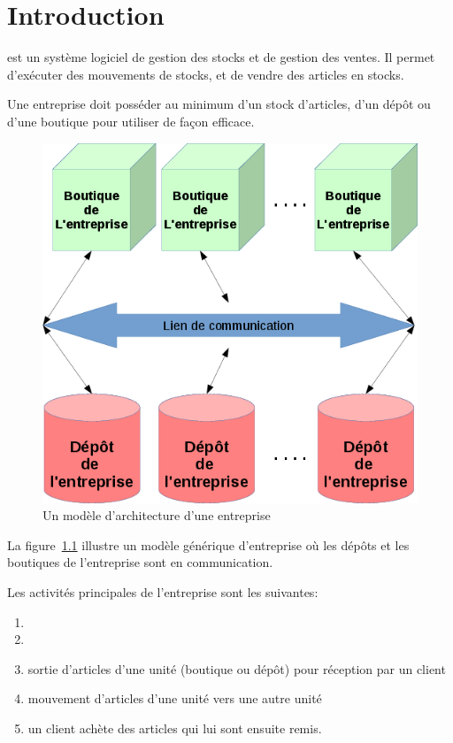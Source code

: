 \chapter{Introduction}\label{chap:introduction}

\yeren est un syst\`eme logiciel de gestion des
stocks et de gestion des ventes. Il permet
d'ex\'ecuter des mouvements de stocks, et de
vendre des articles en stocks.

Une entreprise doit poss\'eder au minimum d'un stock
d'articles, d'un d\'ep\^ot ou d'une boutique pour utiliser
\yeren de fa\c{c}on efficace.\\

\begin{figure}[!htpb]
	\centering
	\includegraphics[scale=0.63]{images/architecture-enterprise-yeren.png}
	\caption{Un mod\`ele d'architecture d'une entreprise}\label{fig:architecture-enterprise-yeren}
\end{figure}

La figure~\ref{fig:architecture-enterprise-yeren} illustre
un mod\`ele g\'en\'erique d'entreprise o\`u les d\'ep\^ots
et les boutiques de l'entreprise sont en communication.

Les activit\'es principales de l'entreprise sont les suivantes:
\begin{enumerate}[1)]
	\item {}
	\item {}
	\item {} sortie d'articles
		d'une unit\'e (boutique ou d\'ep\^ot) pour r\'eception par un client
	\item {} mouvement d'articles
		d'une unit\'e vers une autre unit\'e
	\item {} un client ach\`ete
		des articles qui lui sont ensuite remis.\\
\end{enumerate}

